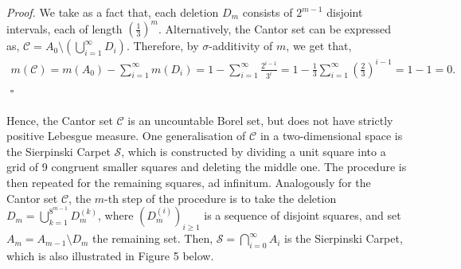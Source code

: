 \documentclass{article}
\begin{document}
\textit{Proof.} We take as a fact that, each deletion $D_m$ consists of $2^{m-1}$ disjoint intervals, each of length $(\frac{1}{3})^m$. Alternatively, the Cantor set can be expressed as, $\mathcal{C} = A_0 \setminus (\bigcup_{i=1}^{\infty}D_i)$. Therefore, by $\sigma$-additivity of $m$, we get that,
\begin{eqnarray}
\nonumber
m(\mathcal{C}) = m(A_0) - \sum_{i=1}^{\infty}m(D_i) = 1 - \sum_{i=1}^{\infty}\frac{2^{i-1}}{3^i} = 1 - \frac{1}{3}\sum_{i=1}^{\infty}\left(\frac{2}{3}\right)^{i-1} = 1 - 1 = 0.
\end{eqnarray}
${}$ \hfill $\square$ \\\\
Hence, the Cantor set $\mathcal{C}$ is an uncountable Borel set, but does not have strictly positive Lebesgue measure. One generalisation of $\mathcal{C}$ in a two-dimensional space is the Sierpinski Carpet $\mathcal{S}$, which is constructed by dividing a unit square into a grid of 9 congruent smaller squares and deleting the middle one. The procedure is then repeated for the remaining squares, ad infinitum. Analogously for the Cantor set $\mathcal{C}$, the $m$-th step of the procedure is to take the deletion $D_m = \bigcup_{k=1}^{8^{m-1}}D_m^{(k)}$, where $(D_m^{(i)})_{i \geq 1}$ is a sequence of disjoint squares, and set $A_m = A_{m-1} \setminus D_m$ the remaining set. Then, $\mathcal{S} = \bigcap_{i=0}^{\infty}A_i$ is the Sierpinski Carpet, which is also illustrated in Figure 5 below.\\\\
\end{document}
